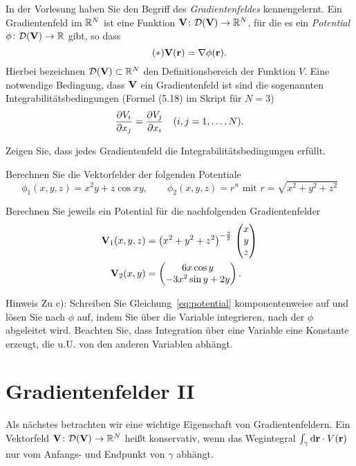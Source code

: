 \documentclass{scrartcl}
\newcommand{\DD}{\mathcal{D}}
\begin{document}
In der Vorlesung haben Sie den Begriff des \emph{Gradientenfeldes} kennengelernt.
Ein Gradientenfeld im $\RR^N$ ist eine Funktion $\mat V\colon \DD(\mat V) \to \RR^N$, für die es ein \emph{Potential} $\phi\colon \DD(\mat V) \to \RR$ gibt, so dass
\[
  \label{eq:potential}
  \tag{$\ast$}
  \mat V(\mat r) = \nabla \phi(\mat r).
\]
Hierbei bezeichnen $\DD(\mat V) \subset \RR^N$ den Definitionsbereich der Funktion $V$.
Eine notwendige Bedingung, dass $\mat V$ ein Gradientenfeld ist sind die sogenannten Integrabilitätsbedingungen (Formel (5.18) im Skript für $N = 3$)
\[
  \pderiv[V_i]{x_j} = \pderiv[V_j]{x_i} \quad (i,j=1,\ldots,N).
\]  
\begin{subex}
  \item{} Zeigen Sie, dass jedes Gradientenfeld die Integrabilitätsbedingungen erfüllt.
  \item{} Berechnen Sie die Vektorfelder der folgenden Potentiale
  \[
    \phi_1(x,y,z) = x^2 y + z \cos xy, \quad\quad \phi_2 (x,y,z) = r^n \mbox{ mit } r = \sqrt{x^2 + y^2 + z^2} 
  \]
  \item{} Berechnen Sie jeweils ein Potential für die nachfolgenden Gradientenfelder
  \begin{align*}
    \mat V_1(x,y,z) &= \left( x^2 + y^2 + z^2 \right)^{-\frac{3}{2}} \, \colvec{x \\ y \\ z} \\
    \mat V_2(x,y) &= \colvec{6x \cos y \\ -3x^2 \sin y + 2y}.
  \end{align*}
\end{subex}
\begin{remark}{Hinweis}
  Zu c): Schreiben Sie Gleichung~\eqref{eq:potential} komponentenweise auf und lösen Sie nach $\phi$ auf, indem Sie über die Variable integrieren, nach der $\phi$ abgeleitet wird.
  Beachten Sie, dass Integration über eine Variable eine Konstante erzeugt, die u.U. von den anderen Variablen abhängt.
\end{remark}

\section{Gradientenfelder II }
\label{sec:gradientenfelder2}

Als nächstes betrachten wir eine wichtige Eigenschaft von Gradientenfeldern.
Ein Vektorfeld $\mat V\colon \DD(\mat V) \to \RR^N$ heißt konservativ, wenn das Wegintegral $\int_\gamma \mat \dd \mat r \cdot V(\mat r) $ nur vom Anfangs- und Endpunkt von $\gamma$ abhängt.
\end{document}
